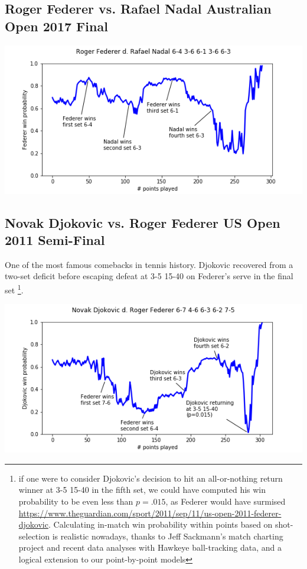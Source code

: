 \documentclass[chapterprefix=false]{report}
\begin{document}
\subsection{Roger Federer vs. Rafael Nadal Australian Open 2017 Final}

\includegraphics[scale=.7]{federer_nadal_ao_17}


\subsection{Novak Djokovic vs. Roger Federer US Open 2011 Semi-Final}

One of the most famous comebacks in tennis history. Djokovic recovered from a two-set deficit before escaping defeat at 3-5 15-40 on Federer's serve in the final set \footnote{if one were to consider Djokovic's decision to hit an all-or-nothing return winner at 3-5 15-40 in the fifth set, we could have computed his win probability to be even less than $p=.015$, as Federer would have surmised \url{https://www.theguardian.com/sport/2011/sep/11/us-open-2011-federer-djokovic}. Calculating in-match win probability within points based on shot-selection is realistic nowadays, thanks to Jeff Sackmann's match charting project and recent data analyses with Hawkeye ball-tracking data, and a logical extension to our point-by-point models}.

\includegraphics[scale=.7]{djokovic_federer_uso_11}






\end{document}
